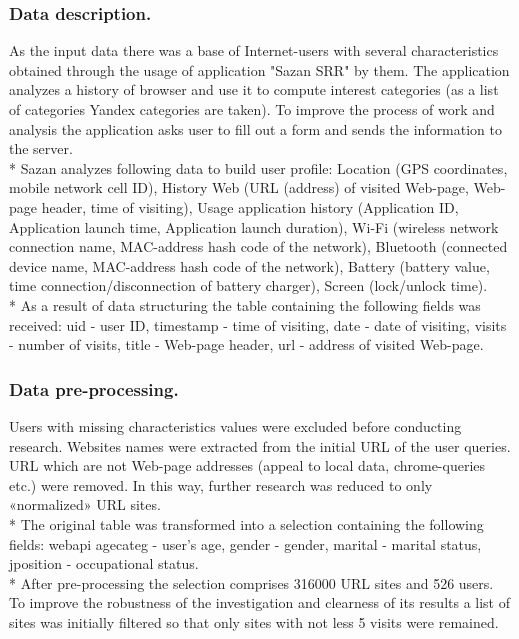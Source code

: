 \documentclass[runningheads,a4paper]{llncs}
\begin{document}
\subsubsection{Data description.}
As the input data there was a base of Internet-users with several characteristics obtained through the usage of application "Sazan SRR" by them.  The application analyzes a history of browser and use it to compute interest categories (as a list of categories Yandex categories are taken). To improve the process of work and analysis the application asks user to fill out a form and sends the information to the server. 
\\* Sazan analyzes following data to build user profile: Location (GPS coordinates, mobile network cell ID), History Web (URL (address) of visited Web-page, Web-page header, time of visiting), Usage application history (Application ID, Application launch time, Application launch duration), Wi-Fi (wireless network connection name, MAC-address hash code of the network), Bluetooth (connected device name, MAC-address hash code of the network), Battery (battery value, time connection/disconnection of battery charger), Screen (lock/unlock time).
\\* As a result of data structuring the table containing the following fields was received: uid - user ID, timestamp - time of visiting, date - date of visiting, visits - number of visits, title - Web-page header, url - address of visited Web-page.



\subsubsection{Data pre-processing.}\label{the-treatment}
Users with missing characteristics values were excluded before conducting research. Websites names were extracted from the initial URL of the user queries. URL which are not  Web-page addresses (appeal to local data, chrome-queries etc.) were removed. In this way, further research was reduced to only «normalized» URL sites.
\\* The original table was transformed into a selection containing the following fields: webapi agecateg - user's age, gender - gender, marital - marital status, jposition - occupational status.
\\* After pre-processing the selection comprises 316000 URL sites and 526 users. 
To improve the robustness of the investigation and clearness of its results a list of sites was initially filtered so that only sites with not less 5 visits were remained.
\end{document}
